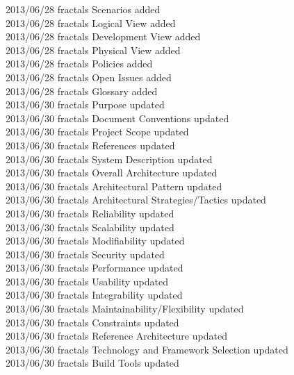 \documentclass[29pt,a4paper]{moderncv}
\begin{document}
\begin{tabbing}
2013/06/28  \>fractals \> Scenarios added\\
2013/06/28  \>fractals \> Logical View added\\
2013/06/28  \> fractals \>Development View added\\
2013/06/28  \> fractals \>Physical View added\\
2013/06/28  \> fractals \>Policies added\\
2013/06/28  \> fractals \>Open Issues added\\
2013/06/28  \> fractals \>Glossary added\\
2013/06/30  \> fractals \>Purpose updated\\
2013/06/30  \>fractals \> Document Conventions updated\\
2013/06/30  \> fractals \>Project Scope updated\\
2013/06/30  \> fractals \>References updated\\
2013/06/30  \> fractals \>System Description updated\\
2013/06/30  \>fractals \> Overall Architecture updated\\
2013/06/30  \> fractals \>Architectural Pattern updated\\	
2013/06/30  \>fractals \> Architectural Strategies/Tactics updated\\
2013/06/30  \> fractals \>Reliability updated\\
2013/06/30  \> fractals \>Scalability updated\\
2013/06/30  \> fractals \>Modifiability updated\\
2013/06/30  \> fractals \>Security updated\\
2013/06/30  \> fractals \>Performance updated\\
2013/06/30  \> fractals \>Usability updated\\
2013/06/30  \> fractals \>Integrability updated\\
2013/06/30  \> fractals \>Maintainability/Flexibility updated\\
2013/06/30  \> fractals \>Constraints updated\\
2013/06/30  \> fractals \>Reference Architecture updated\\
2013/06/30  \> fractals \>Technology and Framework Selection updated\\
2013/06/30  \> fractals \>Build Tools updated\\

\end{tabbing}
\end{document}
